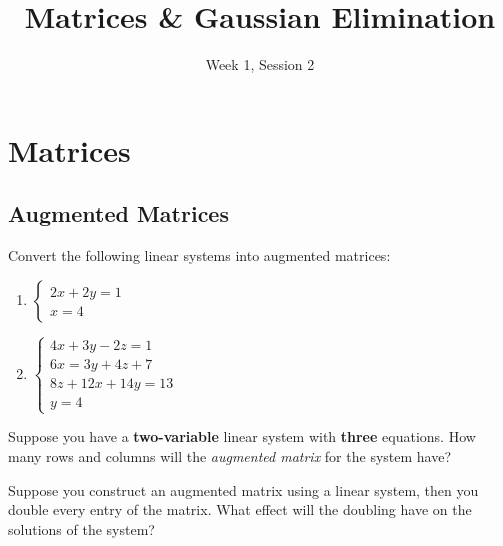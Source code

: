 \documentclass[11pt]{exam}
\title{Matrices \& Gaussian Elimination}
\date{Week 1, Session 2}
\begin{document}
\maketitle

\section{Matrices}
    
    \vspace{20px}
    \subsection{Augmented Matrices}
        \begin{questions}
            \item Convert the following linear systems into augmented matrices:
            \begin{enumerate}
                \item $\begin{cases}
                    2x + 2y = 1 \\
                    x = 4
                    \end{cases}$
                \item $\begin{cases}
                    4x + 3y - 2z = 1 \\
                    6x = 3y + 4z + 7 \\
                    8z + 12x + 14y = 13 \\
                    y = 4
                    \end{cases}$
            \end{enumerate}
            
            \item Suppose you have a \textbf{two-variable} linear system with \textbf{three} equations. How many rows and columns will
            the \textit{augmented matrix} for the system have?

            \item Suppose you construct an augmented matrix using a linear system, then you double every entry of the matrix. What effect will 
            the doubling have on the solutions of the system?
        \end{questions}

        \vspace{20px}
\end{document}
